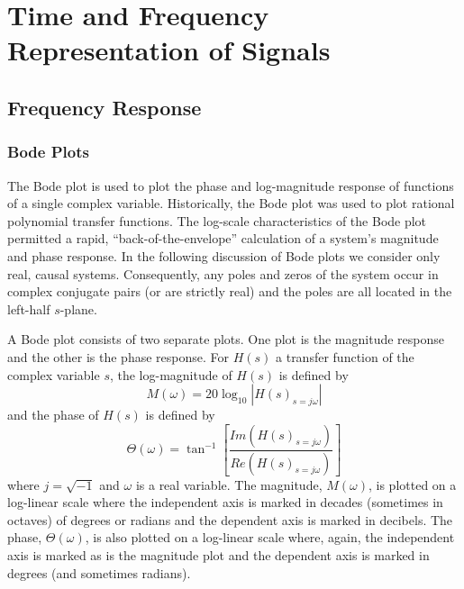 \chapter[Representation of Signals]{Time and Frequency Representation of Signals}

\section{Frequency Response}
\subsection{Bode Plots}
\label{bode}

	The Bode plot is used to plot the phase
and log-magnitude response of functions of a single
complex variable.  Historically, the Bode plot was
used to plot rational polynomial
transfer functions.  The log-scale characteristics
of the Bode plot permitted a rapid, ``back-of-the-envelope''
calculation of a system's magnitude and
phase response.  In the  following discussion of Bode plots
we consider only real, causal systems.
Consequently, any poles and zeros of the system occur
in complex conjugate pairs (or are strictly real) and
the poles are all located in the left-half $s$-plane.

	A Bode plot consists of two separate plots.  One
plot is the magnitude response and the other
is the phase response.  For $H(s)$ a transfer function 
of the complex variable $s$, the 
log-magnitude of $H(s)$ is defined by
%
\begin{equation}
M(\omega)=20\log_{10}|H(s)_{s=j\omega}|
\label{e.bode.1}
\end{equation}
%
and the phase of $H(s)$ is defined by
%
\begin{equation}
\Theta(\omega)=\tan^{-1}[\frac{Im(H(s)_{s=j\omega})}{Re(H(s)_{s=j\omega})}]
\label{e.bode.2}
\end{equation}
%
where $j=\sqrt{-1}$ and $\omega$ is a real variable.  The
magnitude, $M(\omega)$, is plotted on a log-linear scale
where the independent axis is marked in decades (sometimes
in octaves) of degrees or radians and the dependent axis is marked
in decibels.  The phase, $\Theta(\omega)$, is also plotted on a log-linear
scale where, again, the independent axis is marked as is the magnitude plot
and the dependent axis is marked in degrees (and sometimes radians).

